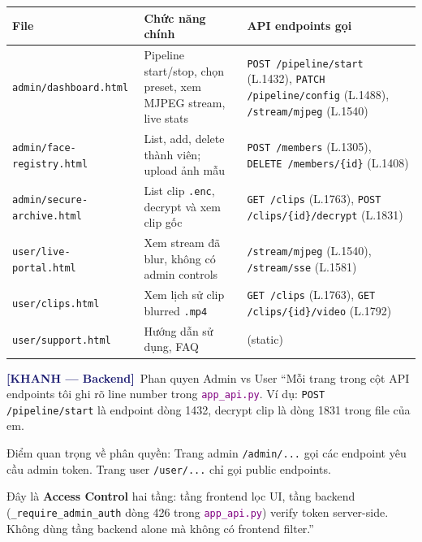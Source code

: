 \documentclass[12pt, a4paper]{article}
\newcommand{\khanh}{\textcolor{MidnightBlue}{\textbf{[KHANH --- Backend]}}}
\newcommand{\fpath}[1]{\texttt{\textcolor{purple}{#1}}}
\begin{document}
\begin{tcolorbox}[colback=gray!5, colframe=MidnightBlue,
  title={\textbf{6 trang HTML em viết --- Tailwind CSS + Neobrutalism}}]
\renewcommand{\arraystretch}{1.4}
\begin{tabularx}{\textwidth}{lXl}
\toprule
\textbf{File} & \textbf{Chức năng chính} & \textbf{API endpoints gọi} \\
\midrule
\texttt{admin/dashboard.html}
  & Pipeline start/stop, chọn preset, xem MJPEG stream, live stats
  & \texttt{POST /pipeline/start} (L.1432), \texttt{PATCH /pipeline/config} (L.1488), \texttt{/stream/mjpeg} (L.1540) \\
\texttt{admin/face-registry.html}
  & List, add, delete thành viên; upload ảnh mẫu
  & \texttt{POST /members} (L.1305), \texttt{DELETE /members/\{id\}} (L.1408) \\
\texttt{admin/secure-archive.html}
  & List clip \texttt{.enc}, decrypt và xem clip gốc
  & \texttt{GET /clips} (L.1763), \texttt{POST /clips/\{id\}/decrypt} (L.1831) \\
\texttt{user/live-portal.html}
  & Xem stream đã blur, không có admin controls
  & \texttt{/stream/mjpeg} (L.1540), \texttt{/stream/sse} (L.1581) \\
\texttt{user/clips.html}
  & Xem lịch sử clip blurred \texttt{.mp4}
  & \texttt{GET /clips} (L.1763), \texttt{GET /clips/\{id\}/video} (L.1792) \\
\texttt{user/support.html}
  & Hướng dẫn sử dụng, FAQ
  & (static) \\
\bottomrule
\end{tabularx}
\end{tcolorbox}

\begin{dialog}{\khanh\ Phan quyen Admin vs User}
``Mỗi trang trong cột API endpoints tôi ghi rõ line number trong \fpath{app\_api.py}.
Ví dụ: \texttt{POST /pipeline/start} là endpoint dòng 1432,
decrypt clip là dòng 1831 trong file của em.

Điểm quan trọng về phân quyền:
Trang admin \texttt{/admin/...} gọi các endpoint yêu cầu admin token.
Trang user \texttt{/user/...} chỉ gọi public endpoints.

Đây là \textbf{Access Control} hai tầng: tầng frontend lọc UI,
tầng backend (\texttt{\_require\_admin\_auth} dòng 426 trong \fpath{app\_api.py})
verify token server-side. Không dùng tầng backend alone mà không có frontend filter.''
\end{dialog}

\end{document}
